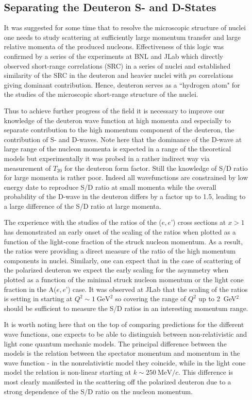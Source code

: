 \subsection{Separating the Deuteron S- and D-States}

It was suggested for some time that to resolve the microscopic structure  of nuclei one needs to study scattering at sufficiently large momentum transfer and large relative momenta of the produced nucleons. Effectiveness of this logic was confirmed by a series of the experiments at BNL and JLab which directly observed  short-range correlations (SRC) in a series of nuclei and established similarity of the SRC in the deuteron and heavier nuclei with $pn$ correlations giving dominant contribution.  Hence, deuteron serves as a ``hydrogen atom" for the studies of the microscopic short-range structure  of the nuclei.

Thus to achieve further progress of the field it is necessary to improve our knowledge of the deuteron wave function at high momenta and especially to separate contribution to the high momentum component of the deuteron, the contribution of S- and D-waves. Note here that the dominance of the D-wave at large range of the nucleon momenta is expected in a range of the theoretical models but experimentally it was probed in a rather indirect way via measurement of $T_{20}$ for the deuteron form factor. Still the knowledge of S/D ratio for large momenta is rather poor. Indeed all wavefunctions are constrained by low energy date to reproduce S/D ratio at small momenta while the overall probability of the D-wave in the deuteron differs by a factor up to 1.5, leading to a large difference of the S/D ratio at large momenta.

The experience with the studies of the ratios of the ($e,e’$) cross sections at $x>1$ has demonstrated an early onset of the scaling of the ratios when plotted as a function of the light-cone fraction of the struck nucleon momentum.  As a result, the ratios were providing a direct measure of the ratio of the high momentum components in nuclei.  Similarly, one can expect that in the case of scattering of the polarized deuteron we expect the early scaling for the asymmetry when plotted as a function of the minimal struck nucleon momentum or the light cone fraction in the A($e,e’$) case.
It was observed at JLab that the scaling of the ratios is setting in starting at $Q^2 \sim 1 \mathrm{~GeV}^2$ so covering the range of $Q^2$ up to 2~GeV$^2$ should be sufficient to  measure the S/D ratios in an interesting momentum range.

It is worth noting here that on the top of comparing predictions for the different wave functions, one expects to be able to distinguish between non-relativistic and light cone quantum mechanic models.  The principal difference between the models is the relation between the spectator momentum and momentum in the wave function - in the nonrelativistic model they coincide, while in the light cone model the relation is non-linear starting at $k \sim 250 \mathrm{~MeV}/c$. This difference is most clearly manifested in the scattering off the polarized deuteron due to a strong dependence of the S/D ratio on the nucleon momentum.